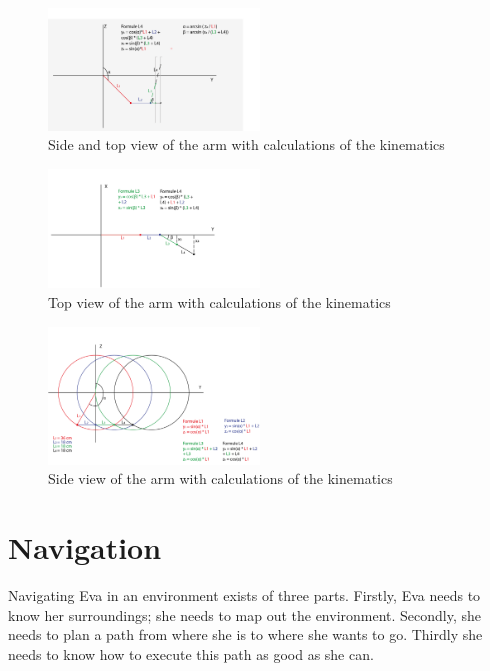 \documentclass[project_eva.tex]{subfiles}
\begin{document}
\begin{figure}[ht!]
	\centering
	\mbox{\includegraphics[width=0.5\textwidth]{Images/3d_zijenbovenaanzicht.png}}
	\caption{Side and top view of the arm with calculations of the kinematics}
	\label{fig:IK0}
\end{figure}

\begin{figure}[ht!]
	\centering
	\mbox{\includegraphics[width=0.5\textwidth]{Images/2d_bovenaanzicht.png}}
	\caption{Top view of the arm with calculations of the kinematics}
	\label{fig:IK1}
\end{figure}

\begin{figure}[ht!]
	\centering
	\mbox{\includegraphics[width=0.5\textwidth]{Images/2d_zijaanzicht.png}}
	\caption{Side view of the arm with calculations of the kinematics}
	\label{fig:IK2}
\end{figure}

\section*{Navigation}
Navigating Eva in an environment exists of three parts. Firstly, Eva needs to know her surroundings; she needs to map out the environment. Secondly, she needs to plan a path from where she is to where she wants to go. Thirdly she needs to know how to execute this path as good as she can.
\end{document}
